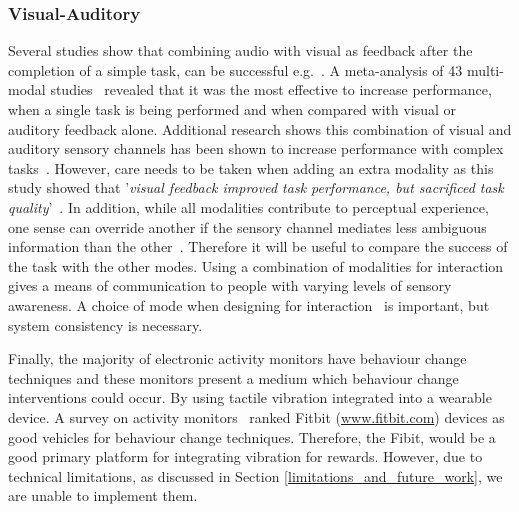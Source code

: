 \subsubsection{Visual-Auditory}
Several studies show that combining audio with visual as feedback after the completion of a simple task, can be successful e.g.~\cite{benefits_of_audio_visual_1, benefits_of_audio_visual_2}. A meta-analysis of 43 multi-modal studies~\cite{comparing_modalities_effects_of_visual_auditory} revealed that it was the most effective to increase performance, when a single task is being performed and when compared with visual or auditory feedback alone. Additional research shows this combination of visual and auditory sensory channels has been shown to increase performance with complex tasks~\cite{chi_oussama_tap_the_shapetones}. However, care needs to be taken when adding an extra modality as this study showed that '\textit{visual feedback improved task performance, but sacrificed task quality}'~\cite{comparing_modalities_effects_of_visual_auditory}. In addition, while all modalities contribute to perceptual experience, one sense can override another if the sensory channel mediates less ambiguous information than the other~\cite{one_mode_override_another}. Therefore it will be useful to compare the success of the task with the other modes. Using a combination of modalities for interaction gives a means of communication to people with varying levels of sensory awareness. A choice of mode when designing for interaction~\cite{article_user_centred_multimodal_reminders} is important, but system consistency is necessary.


Finally, the majority of electronic activity monitors have behaviour change techniques and these monitors present a medium which behaviour change interventions could occur. By using tactile vibration integrated into a wearable device. A survey on activity monitors~\cite{article_wearable_good} ranked Fitbit (\url{www.fitbit.com}) devices as good vehicles for behaviour change techniques. Therefore, the Fibit, would be a good primary platform for integrating vibration for rewards. However, due to technical limitations, as discussed in Section \ref{limitations_and_future_work}, we are unable to implement them.



